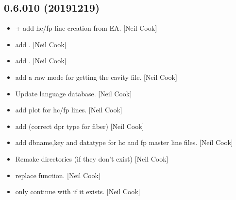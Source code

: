 \documentclass[a4paper,10pt,english]{report}
\begin{document}
\subsection{0.6.010 (2019\sphinxhyphen{}12\sphinxhyphen{}19)}
\label{\detokenize{misc/changelog:id28}}\begin{itemize}
\item {} 
 +  \sphinxhyphen{} add
hc/fp line creation from EA. {[}Neil Cook{]}

\item {} 
 \sphinxhyphen{} add .
{[}Neil Cook{]}

\item {} 
 \sphinxhyphen{} add . {[}Neil Cook{]}

\item {} 
 \sphinxhyphen{} add a raw mode for getting the cavity file. {[}Neil
Cook{]}

\item {} 
Update language database. {[}Neil Cook{]}

\item {} 
 \sphinxhyphen{} add plot  for hc/fp
lines. {[}Neil Cook{]}

\item {} 
 \sphinxhyphen{} add  (correct dpr
type for fiber) {[}Neil Cook{]}

\item {} 
 \sphinxhyphen{} add dbname,key and
datatype for hc and fp master line files. {[}Neil Cook{]}

\item {} 
Re\sphinxhyphen{}make directories (if they don’t exist) {[}Neil Cook{]}

\item {} 
 \sphinxhyphen{} replace  function. {[}Neil Cook{]}

\item {} 
 \sphinxhyphen{} only continue with  if it
exists. {[}Neil Cook{]}


\end{itemize}
\end{document}
